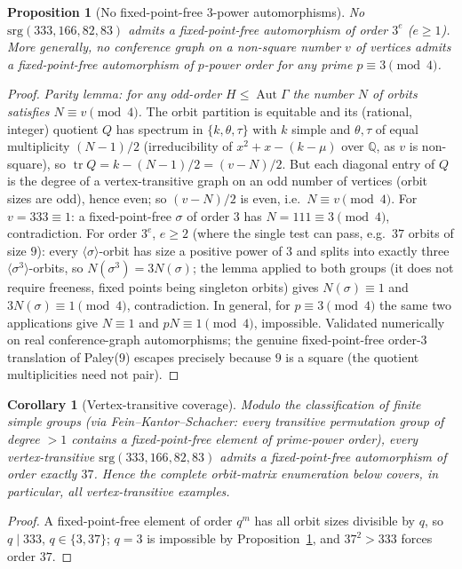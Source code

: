 \documentclass[11pt]{article}
\newtheorem{proposition}{Proposition}
\newtheorem{corollary}{Corollary}
\theoremstyle{definition}
\newcommand{\Q}{\mathbb{Q}}
\begin{document}
\begin{proposition}[No fixed-point-free $3$-power automorphisms]\label{prop:no3}
No $\mathrm{srg}(333,166,82,83)$ admits a fixed-point-free automorphism of order $3^e$
($e\ge1$). More generally, no conference graph on a non-square number $v$ of vertices admits a
fixed-point-free automorphism of $p$-power order for any prime $p\equiv3\pmod4$.
\end{proposition}
\begin{proof}
\emph{Parity lemma: for any odd-order $H\le\operatorname{Aut}\Gamma$ the number $N$ of orbits
satisfies $N\equiv v\pmod 4$.} The orbit partition is equitable and its (rational, integer) quotient
$Q$ has spectrum in $\{k,\theta,\tau\}$ with $k$ simple and $\theta,\tau$ of equal multiplicity
$(N-1)/2$ (irreducibility of $x^2+x-(k-\mu)$ over $\Q$, as $v$ is non-square), so
$\operatorname{tr}Q=k-(N-1)/2=(v-N)/2$. But each diagonal entry of $Q$ is the degree of a
vertex-transitive graph on an odd number of vertices (orbit sizes are odd), hence even; so
$(v-N)/2$ is even, i.e.\ $N\equiv v\pmod4$.
For $v=333\equiv1$: a fixed-point-free $\sigma$ of order $3$ has $N=111\equiv3\pmod4$,
contradiction. For order $3^e$, $e\ge2$ (where the single test can pass, e.g.\ $37$ orbits of size
$9$): every $\langle\sigma\rangle$-orbit has size a positive power of $3$ and splits into exactly
three $\langle\sigma^3\rangle$-orbits, so $N(\sigma^3)=3N(\sigma)$; the lemma applied to both
groups (it does not require freeness, fixed points being singleton orbits) gives
$N(\sigma)\equiv1$ and $3N(\sigma)\equiv1\pmod4$, contradiction. In general, for
$p\equiv3\pmod4$ the same two applications give $N\equiv1$ and $pN\equiv1\pmod4$, impossible.
Validated numerically on real conference-graph automorphisms; the genuine fixed-point-free
order-$3$ translation of Paley($9$) escapes precisely because $9$ is a square (the quotient
multiplicities need not pair).
\end{proof}

\begin{corollary}[Vertex-transitive coverage]\label{cor:vt}
Modulo the classification of finite simple groups (via Fein--Kantor--Schacher: every transitive
permutation group of degree $>1$ contains a fixed-point-free element of prime-power order), every
\emph{vertex-transitive} $\mathrm{srg}(333,166,82,83)$ admits a fixed-point-free automorphism of
order exactly $37$. Hence the complete orbit-matrix enumeration below covers, in particular, all
vertex-transitive examples.
\end{corollary}
\begin{proof}
A fixed-point-free element of order $q^m$ has all orbit sizes divisible by $q$, so $q\mid333$,
$q\in\{3,37\}$; $q=3$ is impossible by Proposition~\ref{prop:no3}, and $37^2>333$ forces order
$37$.
\end{proof}
\end{document}
